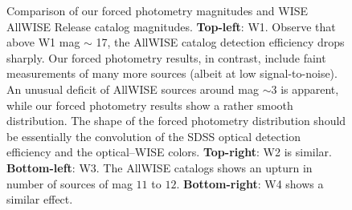 \documentclass[12pt,preprint]{aastex}
\begin{document}
\begin{figure}
\begin{center}
\begin{tabular}{@{}c@{}c@{}}
\end{tabular}
\end{center}
\caption{Comparison of our forced photometry magnitudes and WISE
  AllWISE Release catalog magnitudes.  \textbf{Top-left}: W1.  Observe
  that above W1 mag $\sim$ 17, the AllWISE catalog detection
  efficiency drops sharply.  Our forced photometry results, in
  contrast, include faint measurements of many more sources (albeit at
  low signal-to-noise).  An unusual deficit of AllWISE sources around
  mag $\sim 3$ is apparent, while our forced photometry results show a
  rather smooth distribution.  The shape of the forced photometry
  distribution should be essentially the convolution of the SDSS optical
  detection efficiency and the optical--WISE colors.
  \textbf{Top-right}: W2 is similar.  \textbf{Bottom-left}: W3.  The
  AllWISE catalogs shows an upturn in number of sources of mag $11$ to
  $12$.  \textbf{Bottom-right}: W4 shows a similar effect.
  \label{fig:maghists}}
\end{figure}
\end{document}
